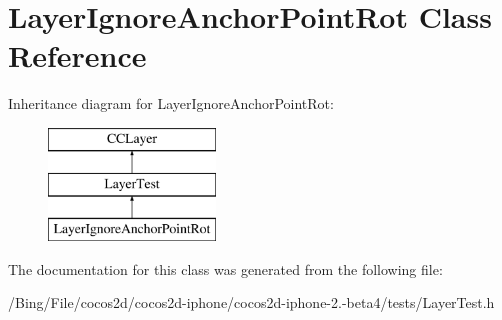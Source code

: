\hypertarget{interface_layer_ignore_anchor_point_rot}{\section{Layer\-Ignore\-Anchor\-Point\-Rot Class Reference}
\label{interface_layer_ignore_anchor_point_rot}
}
Inheritance diagram for Layer\-Ignore\-Anchor\-Point\-Rot\-:\begin{figure}[H]
\begin{center}
\leavevmode
\includegraphics[height=3.000000cm]{interface_layer_ignore_anchor_point_rot}
\end{center}
\end{figure}


The documentation for this class was generated from the following file\-:\begin{DoxyCompactItemize}
\item 
/\-Bing/\-File/cocos2d/cocos2d-\/iphone/cocos2d-\/iphone-\/2.-\/beta4/tests/Layer\-Test.\-h\end{DoxyCompactItemize}
